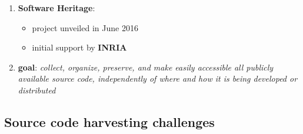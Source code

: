 \documentclass[11pt]{article}
\providecommand{\tightlist}{%
      \setlength{\itemsep}{0pt}\setlength{\parskip}{0pt}}
\begin{document}
\begin{enumerate}
\def\labelenumi{\arabic{enumi}.}
\tightlist
\item
  \textbf{Software Heritage}:

  \begin{itemize}
  \tightlist
  \item
    project unveiled in June 2016
  \item
    initial support by \textbf{INRIA}
  \end{itemize}
\item
  \textbf{goal}: \emph{collect, organize, preserve, and make easily
  accessible all publicly available source code, independently of where
  and how it is being developed or distributed}
\end{enumerate}

\hypertarget{source-code-harvesting-challenges}{%
\subsection{Source code harvesting
challenges}\label{source-code-harvesting-challenges}}
\end{document}
